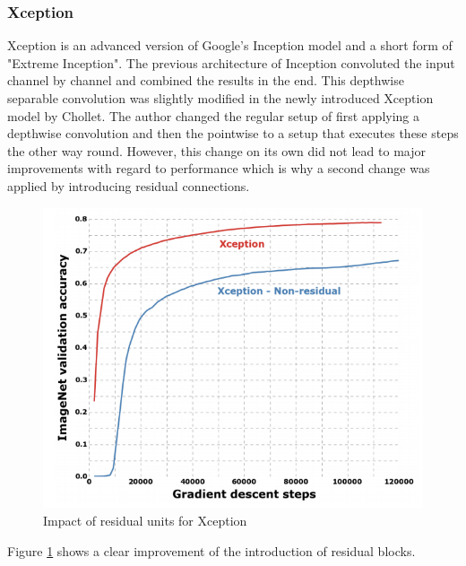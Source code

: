 \subsubsection{Xception}\label{chapter_xception}

Xception is an advanced version of Google's Inception model and a short form of "Extreme Inception". The previous architecture of Inception convoluted the input channel by channel and combined the results in the end. This depthwise separable convolution was slightly modified in the newly introduced Xception model by Chollet\cite{chollet2017xception}. The author changed the regular setup of first applying a depthwise convolution and then the pointwise to a setup that executes these steps the other way round. However, this change on its own did not lead to major improvements with regard to performance which is why a second change was applied by introducing residual connections\cite{chollet2017xception}.
\begin{figure}[ht]
  \centering
  \includegraphics[width=\linewidth]{figures/xception_residuals.png}
  \caption{Impact of residual units for Xception\cite{chollet2017xception}}
  \label{xception_residuals}
\end{figure}

Figure \ref{xception_residuals} shows a clear improvement of the introduction of residual blocks.

